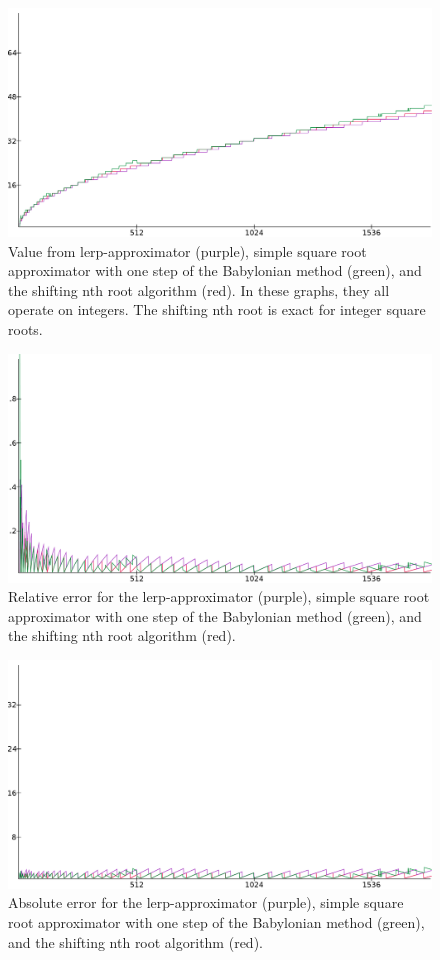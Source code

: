 		\begin{figure}[H]
			\centering
			\includegraphics[width=0.75\linewidth]{figure/value_lin12x.png} 
			\caption{Value from lerp-approximator (purple), simple square root
				approximator with one step of the Babylonian method (green),
				and the shifting nth root algorithm (red). In these graphs, 
				they all operate on integers. The shifting nth root is exact 
				for integer square roots.}
			\label{sres4}
		\end{figure}

		\begin{figure}[H]
			\centering
			\includegraphics[width=0.75\linewidth]{figure/rel_lin960x.png} 
			\caption{Relative error for the lerp-approximator (purple), simple 
				square root approximator with one step of the Babylonian method 
				(green), and the shifting nth root algorithm (red).}
			\label{sres5}
		\end{figure}

		\begin{figure}[H]
			\centering
			\includegraphics[width=0.75\linewidth]{figure/abs_lin24x.png} 
			\caption{Absolute error for the lerp-approximator (purple), simple 
				square root approximator with one step of the Babylonian method 
				(green), and the shifting nth root algorithm (red).}
			\label{sres6}
		\end{figure}

